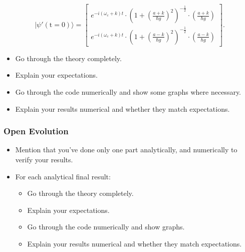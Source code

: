 \documentclass[12pt]{article}
\begin{document}
\begin{equation*}
    |\psi'(\text{t} = 0)\rangle = 
    \begin{bmatrix}
        e^{-i(\omega_c + k)t}\cdot\left(1 + \left(\frac{a + k}{\hbar g}\right)^2\right)^{-\frac{1}{2}}\cdot\left(\frac{a + k}{\hbar g}\right) \\
        e^{-i(\omega_c + k)t}\cdot\left(1 + \left(\frac{a - k}{\hbar g}\right)^2\right)^{-\frac{1}{2}}\cdot\left(\frac{a - k}{\hbar g}\right)
    \end{bmatrix}.
\end{equation*}



























\newpage
\begin{itemize}
    
    \begin{itemize}
        \item Go through the theory completely. 
        \item Explain your expectations.
        \item Go through the code numerically and show some graphs where necessary. 
        \item Explain your results numerical and whether they match expectations. 
    \end{itemize}
\end{itemize}
\subsubsection{Open Evolution}
\begin{itemize}
    \item Mention that you've done only one part analytically, and numerically to verify your results.
    \item For each analytical final result:
    \begin{itemize}
        \item Go through the theory completely. 
        \item Explain your expectations.
        \item Go through the code numerically and show graphs. 
        \item Explain your results numerical and whether they match expectations. 
    \end{itemize}
\end{itemize}
\end{document}
